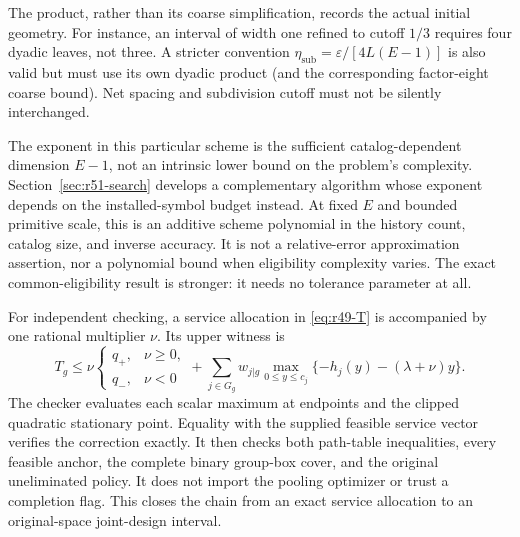 The product, rather than its coarse simplification, records the actual initial geometry. For instance, an interval of width one refined to cutoff $1/3$ requires four dyadic leaves, not three. A stricter convention $\eta_{\mathrm{sub}}=\varepsilon/[4L(E-1)]$ is also valid but must use its own dyadic product (and the corresponding factor-eight coarse bound). Net spacing and subdivision cutoff must not be silently interchanged.

The exponent in this particular scheme is the sufficient catalog-dependent dimension $E-1$, not an intrinsic lower bound on the problem's complexity. Section~\ref{sec:r51-search} develops a complementary algorithm whose exponent depends on the installed-symbol budget instead. At fixed $E$ and bounded primitive scale, this is an additive scheme polynomial in the history count, catalog size, and inverse accuracy. It is not a relative-error approximation assertion, nor a polynomial bound when eligibility complexity varies. The exact common-eligibility result is stronger: it needs no tolerance parameter at all.

For independent checking, a service allocation in \eqref{eq:r49-T} is accompanied by one rational multiplier $\nu$. Its upper witness is
\begin{equation}\label{eq:r49-service-dual}
 T_g\leq
 \nu\begin{cases}q_+,&\nu\geq0,\\q_-,&\nu<0\end{cases}
 +\sum_{j\in G_g}w_{j|g}\max_{0\leq y\leq c_j}
        \{-h_j(y)-(\lambda+\nu)y\}.
\end{equation}
The checker evaluates each scalar maximum at endpoints and the clipped quadratic stationary point. Equality with the supplied feasible service vector verifies the correction exactly. It then checks both path-table inequalities, every feasible anchor, the complete binary group-box cover, and the original uneliminated policy. It does not import the pooling optimizer or trust a completion flag. This closes the chain from an exact service allocation to an original-space joint-design interval.
